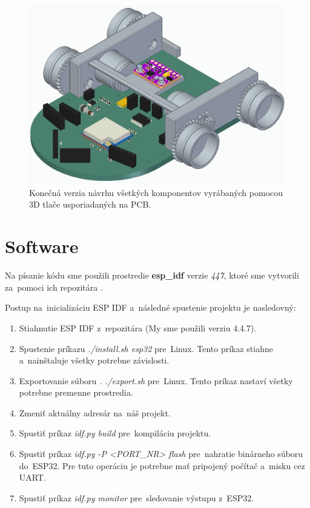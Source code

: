 \begin{figure}[!htpb]
    \centering
    \includegraphics[width=1\linewidth]{includes//images/main_board.jpg}
    \caption{Konečná verzia návrhu všetkých komponentov vyrábaných pomocou 3D tlače usporiadaných na PCB.}
    \label{fig:MainBoard}
\end{figure}

\section{Software}
\label{sec:software}

Na písanie kódu sme použili prostredie \textbf{esp\_idf} verzie \textit{4\.4\.7}, ktoré sme vytvorili za~pomoci
ich repozitára \cite{espGithub}.

Postup na~inicializáciu ESP IDF a~následné spustenie projektu je nasledovný:
\begin{enumerate}
	\item Stiahnutie ESP IDF z~repozitára \cite{espGithub} (My sme použili verziu 4.4.7).
	\item Spustenie príkazu \textit{./install.sh esp32} pre~Linux.
		Tento príkaz stiahne a~nainštaluje všetky potrebne závislosti.
	\item Exportovanie súboru \textit{. ./export.sh} pre~Linux.
		Tento príkaz nastaví všetky potrebne premenne prostredia.
	\item Zmeniť aktuálny adresár na~náš projekt.
	\item Spustiť príkaz \textit{idf.py build} pre~kompiláciu projektu.
	\item Spustiť príkaz \textit{idf.py -P <PORT\_NR> flash} pre~nahratie binárneho súboru do~ESP32.
		Pre tuto operáciu je potrebne mať pripojený počítač a~misku cez UART.
	\item Spustiť príkaz \textit{idf.py monitor} pre~sledovanie výstupu z~ESP32.
\end{enumerate}

